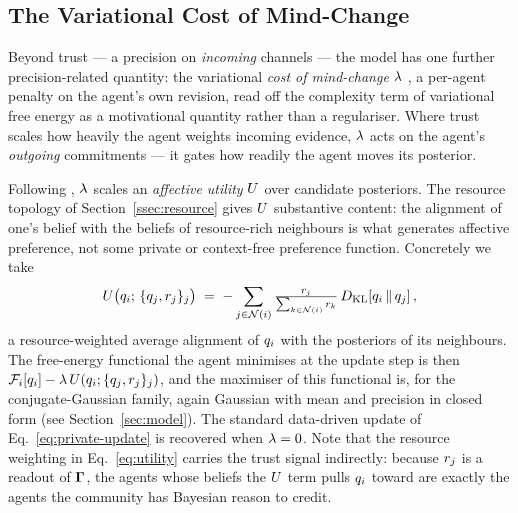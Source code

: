 \subsection{The Variational Cost of Mind-Change}
\label{ssec:mindchange}

Beyond trust --- a precision on \emph{incoming} channels --- the model
has one further precision-related quantity: the variational \emph{cost
of mind-change} $\lambda$ \citep{hylandAlbarracin2025MindChange}, a
per-agent penalty on the agent's own revision, read off the complexity
term of variational free energy as a motivational quantity rather than
a regulariser. Where trust scales how heavily the agent weights
incoming evidence, $\lambda$ acts on the agent's \emph{outgoing}
commitments --- it gates how readily the agent moves its posterior.

Following \citet{hylandAlbarracin2025MindChange}, $\lambda$ scales an
\emph{affective utility} $U$ over candidate posteriors. The
resource topology of Section~\ref{ssec:resource} gives $U$
substantive content: the alignment of one's belief with the beliefs of
resource-rich neighbours is what generates affective preference, not
some private or context-free preference function. Concretely we take
\begin{equation}
U\bigl(q_i;\,\{q_j, r_{j}\}_j\bigr)
\;=\;
-\sum_{j \in \mathcal{N}(i)}
   \tfrac{r_{j}}{\sum_{k \in \mathcal{N}(i)} r_{k}}\,
   D_{\mathrm{KL}}\!\left[q_i \,\|\, q_j\right],
\label{eq:utility}
\end{equation}
a resource-weighted average alignment of $q_i$ with the posteriors of
its neighbours. The free-energy functional the agent minimises at the
update step is then
$\mathcal{F}_i[q_i] - \lambda\,U(q_i; \{q_j,r_{j}\}_j)$, and the
maximiser of this functional is, for the conjugate-Gaussian family,
again Gaussian with mean and precision in closed form (see
Section~\ref{sec:model}). The standard data-driven update of
Eq.~\eqref{eq:private-update} is recovered when $\lambda = 0$. Note that
the resource weighting in Eq.~\eqref{eq:utility} carries the trust
signal indirectly: because $r_{j}$ is a readout of
$\boldsymbol{\Gamma}$, the agents whose beliefs the $U$ term pulls
$q_i$ toward are exactly the agents the community has Bayesian
reason to credit.

